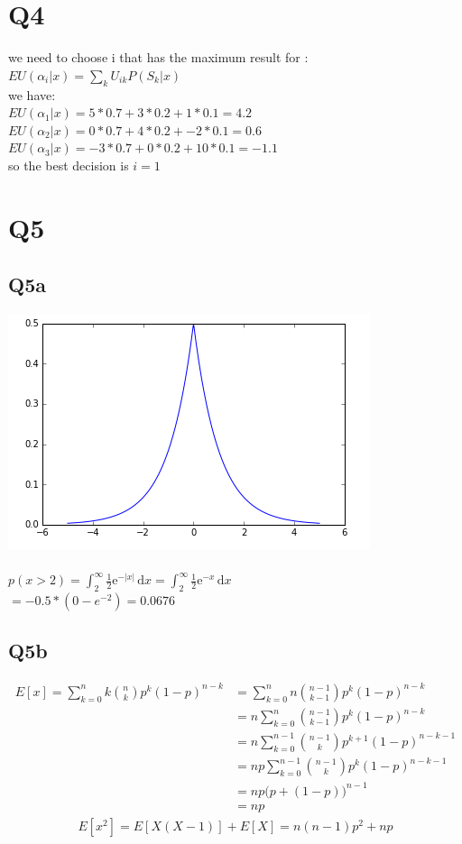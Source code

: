 \documentclass[11]{article}
\begin{document}
 \section*{Q4}
we need to choose i that has the maximum result for : $EU(\alpha_i|x) = \displaystyle\sum_{k} U_{ik}P(S_k|x)$ \\
we have: \\
$EU(\alpha_1|x) = 5 * 0.7 + 3 * 0.2 + 1 * 0.1 = 4.2$\\
$EU(\alpha_2|x) = 0 * 0.7 + 4 * 0.2 + -2 * 0.1 = 0.6$\\
$EU(\alpha_3|x) = -3 * 0.7 + 0 * 0.2 + 10 * 0.1 = -1.1$\\
so the best decision is $i = 1$

 \section*{Q5}
 \subsection*{Q5a} 

 
\includegraphics[scale=0.5]{fig1.png}
\\\\
 $p(x > 2) = \int_2^\infty \frac{1}{2}\mathrm{e}^{-|x|}\,\mathrm{d}x = \int_2^\infty \frac{1}{2}\mathrm{e}^{-x}\,\mathrm{d}x$ \\
 $ = -0.5 * (0 - e^{-2}) = 0.0676$

 \subsection*{Q5b}
 \begin{align*}
E[x] = \sum^n_{k=0}k\binom nkp^k(1-p)^{n-k}&=\sum_{k=0}^nn\binom{n-1}{k-1}p^k(1-p)^{n-k}\\
&=n\sum_{k=0}^n\binom{n-1}{k-1}p^k(1-p)^{n-k}\\
&=n\sum_{k=0}^{n-1}\binom{n-1}kp^{k+1}(1-p)^{n-k-1}\\
&=np\sum_{k=0}^{n-1}\binom{n-1}kp^k(1-p)^{n-k-1}\\
&=np\Big(p+(1-p)\Big)^{n-1}\\
&=np\
\end{align*}
\begin{align*}
E[x^2] = E[X(X-1)]+E[X] = n(n-1)p^2 + np
\end{align*}
 \\\\\\
 
\end{document}
